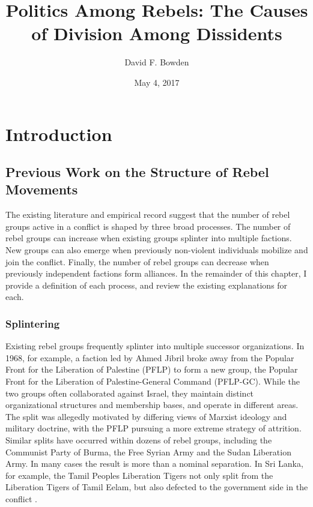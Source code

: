\documentclass[12pt,]{book}
\title{Politics Among Rebels: The Causes of Division Among Dissidents}
\author{David F. Bowden}
\date{May 4, 2017}
\begin{document}
\maketitle

{
\setcounter{tocdepth}{1}
\tableofcontents
}
\doublespacing

\chapter{Introduction}\label{introduction}

\section{Previous Work on the Structure of Rebel
Movements}\label{previous-work-on-the-structure-of-rebel-movements}

The existing literature and empirical record suggest that the number of
rebel groups active in a conflict is shaped by three broad processes.
The number of rebel groups can increase when existing groups splinter
into multiple factions. New groups can also emerge when previously
non-violent individuals mobilize and join the conflict. Finally, the
number of rebel groups can decrease when previously independent factions
form alliances. In the remainder of this chapter, I provide a definition
of each process, and review the existing explanations for each.

\subsection{Splintering}\label{splintering}

Existing rebel groups frequently splinter into multiple successor
organizations. In 1968, for example, a faction led by Ahmed Jibril broke
away from the Popular Front for the Liberation of Palestine (PFLP) to
form a new group, the Popular Front for the Liberation of
Palestine-General Command (PFLP-GC). While the two groups often
collaborated against Israel, they maintain distinct organizational
structures and membership bases, and operate in different areas. The
split was allegedly motivated by differing views of Marxist ideology and
military doctrine, with the PFLP pursuing a more extreme strategy of
attrition. Similar splits have occurred within dozens of rebel groups,
including the Communist Party of Burma, the Free Syrian Army and the
Sudan Liberation Army. In many cases the result is more than a nominal
separation. In Sri Lanka, for example, the Tamil Peoples Liberation
Tigers not only split from the Liberation Tigers of Tamil Eelam, but
also defected to the government side in the conflict
\citep{Staniland2012d}.
\end{document}
